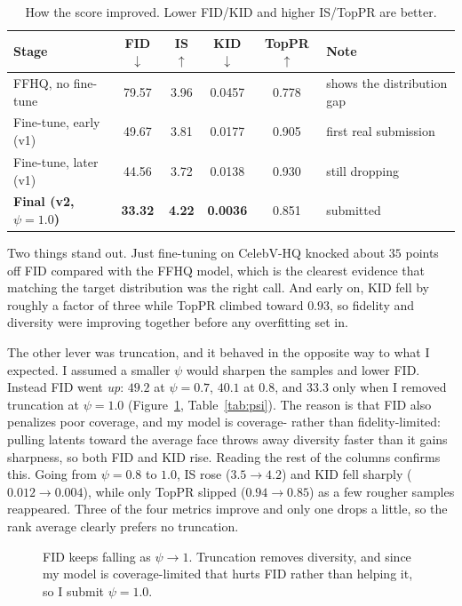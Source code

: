 \documentclass{article}
\begin{document}
\begin{table}[h]
\centering
\caption{How the score improved. Lower FID/KID and higher IS/TopPR are better.}
\label{tab:results}
\begin{tabular}{lccccl}
\toprule
Stage & FID$\downarrow$ & IS$\uparrow$ & KID$\downarrow$ & TopPR$\uparrow$ & Note \\
\midrule
FFHQ, no fine-tune             & 79.57 & 3.96 & 0.0457 & 0.778 & shows the distribution gap \\
Fine-tune, early (v1)          & 49.67 & 3.81 & 0.0177 & 0.905 & first real submission \\
Fine-tune, later (v1)          & 44.56 & 3.72 & 0.0138 & 0.930 & still dropping \\
\textbf{Final (v2, $\psi=1.0$)} & \textbf{33.32} & \textbf{4.22} & \textbf{0.0036} & 0.851 & submitted \\
\bottomrule
\end{tabular}
\end{table}

Two things stand out. Just fine-tuning on CelebV-HQ knocked about $35$ points off FID compared with the
FFHQ model, which is the clearest evidence that matching the target distribution was the right call. And
early on, KID fell by roughly a factor of three while TopPR climbed toward $0.93$, so fidelity and
diversity were improving together before any overfitting set in.

The other lever was truncation, and it behaved in the opposite way to what I expected. I assumed a smaller
$\psi$ would sharpen the samples and lower FID. Instead FID went \emph{up}: $49.2$ at $\psi=0.7$, $40.1$ at
$0.8$, and $33.3$ only when I removed truncation at $\psi=1.0$ (Figure~\ref{fig:psi},
Table~\ref{tab:psi}). The reason is that FID also penalizes poor coverage, and my model is coverage- rather
than fidelity-limited: pulling latents toward the average face throws away diversity faster than it gains
sharpness, so both FID and KID rise. Reading the rest of the columns confirms this. Going from $\psi=0.8$
to $1.0$, IS rose ($3.5\to4.2$) and KID fell sharply ($0.012\to0.004$), while only TopPR slipped
($0.94\to0.85$) as a few rougher samples reappeared. Three of the four metrics improve and only one drops a
little, so the rank average clearly prefers no truncation.

\begin{figure}[t]
\centering
{}
\caption{FID keeps falling as $\psi\to1$. Truncation removes diversity, and since my model is
coverage-limited that hurts FID rather than helping it, so I submit $\psi=1.0$.}
\label{fig:psi}
\end{figure}
\end{document}
